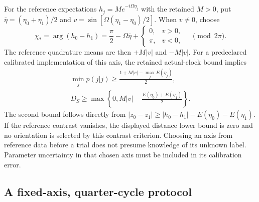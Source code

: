For the reference expectations $h_j=Me^{-i\Omega\eta_j}$ with the
retained $M>0$, put
$\bar\eta=(\eta_0+\eta_1)/2$ and
$v=\sin[\Omega(\eta_1-\eta_0)/2]$.
When $v\ne0$, choose
\begin{equation}
 \chi_* =\arg(h_0-h_1)
 =\frac\pi2-\Omega\bar\eta+
 \begin{cases}0,&v>0,\\ \pi,&v<0,\end{cases}
 \quad \pmod{2\pi}.
\label{eq:chvi-decoder-reference-axis}
\end{equation}
The reference quadrature means are then $+M|v|$ and $-M|v|$.
For a predeclared calibrated implementation of this axis, the retained
actual-clock bound implies
\begin{equation}
\begin{gathered}
\min_jp(j|j)\geq
 \frac{1+M|v|-\max_jE(\eta_j)}2,
 \\
 D_S\geq\max\left\{0,M|v|-\frac{E(\eta_0)+E(\eta_1)}2\right\}.
\end{gathered}
\label{eq:chvi-decoder-general-bounds}
\end{equation}
The second bound follows directly from
$|z_0-z_1|\geq|h_0-h_1|-E(\eta_0)-E(\eta_1)$.
If the reference contrast vanishes, the displayed distance lower bound
is zero and no orientation is selected by this contrast criterion.
Choosing an axis from reference data before a trial does not presume
knowledge of its unknown label. Parameter uncertainty in that chosen
axis must be included in its calibration error.

\subsection{A fixed-axis, quarter-cycle protocol}

